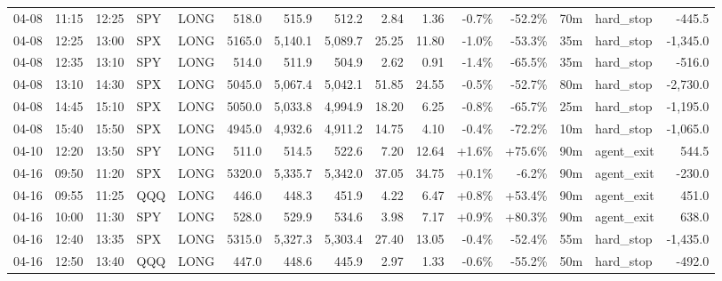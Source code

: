 \documentclass[11pt,a4paper,twoside]{article}
\begin{document}
\begin{landscape}
\begin{center}
\begin{longtable}{>{\color{txtmain}}l l l l l r r r r r r r r >{\color{txtmain}}l r}
04-08 & 11:15 & 12:25 & SPY & LONG & 518.0 & 515.9 & 512.2 & 2.84 & 1.36 & \textcolor{lossred}{-0.7\%} & \textcolor{lossred}{-52.2\%} & 70m & hard\_stop & \textcolor{lossred}{-445.5} \\
04-08 & 12:25 & 13:00 & SPX & LONG & 5165.0 & 5,140.1 & 5,089.7 & 25.25 & 11.80 & \textcolor{lossred}{-1.0\%} & \textcolor{lossred}{-53.3\%} & 35m & hard\_stop & \textcolor{lossred}{-1,345.0} \\
04-08 & 12:35 & 13:10 & SPY & LONG & 514.0 & 511.9 & 504.9 & 2.62 & 0.91 & \textcolor{lossred}{-1.4\%} & \textcolor{lossred}{-65.5\%} & 35m & hard\_stop & \textcolor{lossred}{-516.0} \\
04-08 & 13:10 & 14:30 & SPX & LONG & 5045.0 & 5,067.4 & 5,042.1 & 51.85 & 24.55 & \textcolor{lossred}{-0.5\%} & \textcolor{lossred}{-52.7\%} & 80m & hard\_stop & \textcolor{lossred}{-2,730.0} \\
04-08 & 14:45 & 15:10 & SPX & LONG & 5050.0 & 5,033.8 & 4,994.9 & 18.20 & 6.25 & \textcolor{lossred}{-0.8\%} & \textcolor{lossred}{-65.7\%} & 25m & hard\_stop & \textcolor{lossred}{-1,195.0} \\
04-08 & 15:40 & 15:50 & SPX & LONG & 4945.0 & 4,932.6 & 4,911.2 & 14.75 & 4.10 & \textcolor{lossred}{-0.4\%} & \textcolor{lossred}{-72.2\%} & 10m & hard\_stop & \textcolor{lossred}{-1,065.0} \\
04-10 & 12:20 & 13:50 & SPY & LONG & 511.0 & 514.5 & 522.6 & 7.20 & 12.64 & \textcolor{wingreen}{+1.6\%} & \textcolor{wingreen}{+75.6\%} & 90m & agent\_exit & \textcolor{wingreen}{544.5} \\
04-16 & 09:50 & 11:20 & SPX & LONG & 5320.0 & 5,335.7 & 5,342.0 & 37.05 & 34.75 & \textcolor{wingreen}{+0.1\%} & \textcolor{lossred}{-6.2\%} & 90m & agent\_exit & \textcolor{lossred}{-230.0} \\
04-16 & 09:55 & 11:25 & QQQ & LONG & 446.0 & 448.3 & 451.9 & 4.22 & 6.47 & \textcolor{wingreen}{+0.8\%} & \textcolor{wingreen}{+53.4\%} & 90m & agent\_exit & \textcolor{wingreen}{451.0} \\
04-16 & 10:00 & 11:30 & SPY & LONG & 528.0 & 529.9 & 534.6 & 3.98 & 7.17 & \textcolor{wingreen}{+0.9\%} & \textcolor{wingreen}{+80.3\%} & 90m & agent\_exit & \textcolor{wingreen}{638.0} \\
04-16 & 12:40 & 13:35 & SPX & LONG & 5315.0 & 5,327.3 & 5,303.4 & 27.40 & 13.05 & \textcolor{lossred}{-0.4\%} & \textcolor{lossred}{-52.4\%} & 55m & hard\_stop & \textcolor{lossred}{-1,435.0} \\
04-16 & 12:50 & 13:40 & QQQ & LONG & 447.0 & 448.6 & 445.9 & 2.97 & 1.33 & \textcolor{lossred}{-0.6\%} & \textcolor{lossred}{-55.2\%} & 50m & hard\_stop & \textcolor{lossred}{-492.0} \\

\end{longtable}
\end{center}
\end{landscape}
\end{document}
